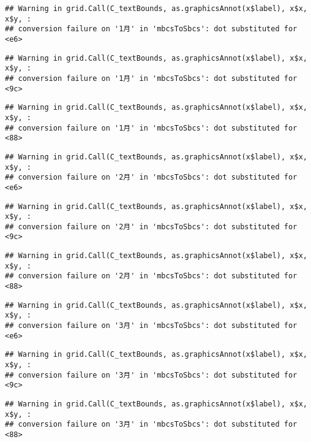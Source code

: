 \documentclass[]{ctexart}
\begin{document}
\begin{verbatim}
## Warning in grid.Call(C_textBounds, as.graphicsAnnot(x$label), x$x, x$y, :
## conversion failure on '1月' in 'mbcsToSbcs': dot substituted for <e6>
\end{verbatim}

\begin{verbatim}
## Warning in grid.Call(C_textBounds, as.graphicsAnnot(x$label), x$x, x$y, :
## conversion failure on '1月' in 'mbcsToSbcs': dot substituted for <9c>
\end{verbatim}

\begin{verbatim}
## Warning in grid.Call(C_textBounds, as.graphicsAnnot(x$label), x$x, x$y, :
## conversion failure on '1月' in 'mbcsToSbcs': dot substituted for <88>
\end{verbatim}

\begin{verbatim}
## Warning in grid.Call(C_textBounds, as.graphicsAnnot(x$label), x$x, x$y, :
## conversion failure on '2月' in 'mbcsToSbcs': dot substituted for <e6>
\end{verbatim}

\begin{verbatim}
## Warning in grid.Call(C_textBounds, as.graphicsAnnot(x$label), x$x, x$y, :
## conversion failure on '2月' in 'mbcsToSbcs': dot substituted for <9c>
\end{verbatim}

\begin{verbatim}
## Warning in grid.Call(C_textBounds, as.graphicsAnnot(x$label), x$x, x$y, :
## conversion failure on '2月' in 'mbcsToSbcs': dot substituted for <88>
\end{verbatim}

\begin{verbatim}
## Warning in grid.Call(C_textBounds, as.graphicsAnnot(x$label), x$x, x$y, :
## conversion failure on '3月' in 'mbcsToSbcs': dot substituted for <e6>
\end{verbatim}

\begin{verbatim}
## Warning in grid.Call(C_textBounds, as.graphicsAnnot(x$label), x$x, x$y, :
## conversion failure on '3月' in 'mbcsToSbcs': dot substituted for <9c>
\end{verbatim}

\begin{verbatim}
## Warning in grid.Call(C_textBounds, as.graphicsAnnot(x$label), x$x, x$y, :
## conversion failure on '3月' in 'mbcsToSbcs': dot substituted for <88>
\end{verbatim}
\end{document}
